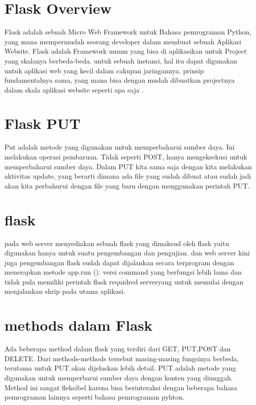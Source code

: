 \section{Flask Overview}
Flask adalah sebuah Micro Web Framework untuk Bahasa pemrograman Python, yang mana  mempermudah
seorang developer dalam membuat sebuah Aplikasi Website. Flask adalah Framework umum
yang bisa di aplikasikan untuk Project yang skalanya berbeda-beda. untuk sebuah 
instansi, hal itu dapat digunakan untuk aplikasi web yang kecil dalam cakupan jaringannya.
prinsip fundamentalnya sama, yang mana bisa dengan mudah dibuatkan projectnya dalam skala aplikasi
website seperti apa saja \cite{alemu2014rest}.
\section{Flask PUT}
Put adalah metode yang digunakan untuk memperbaharui sumber daya. Ini melakukan operasi pembaruan. 
Tidak seperti POST, hanya mengeksekusi untuk memperbaharui sumber daya. Dalam PUT kita sama saja dengan kita 
melakukan aktivitas update, yang berarti dimana ada file yang sudah dibuat atau sudah jadi akan kita perbahurui 
dengan file yang baru dengan menggunakan perintah PUT.

\section{flask}
pada web server menyediakan sebuah flask yang dimaksud oleh flask yaitu digunakan hanya untuk suatu pengembangan dan pengujian. dan web server kini juga pengembangan flask sudah  dapat dijalankan secara terprogram dengan menerapkan metode app.run (). versi command yang  berfungsi lebih lama dan tidak pula memiliki perintah flask requidred serveryang untuk memulai dengan menjalankan skrip pada utama aplikasi.

\section{methods dalam Flask}
Ada beberapa method dalam flask yang terdiri dari GET, PUT,POST dan DELETE. Dari methods-methods tersebut masing-masing fungsinya berbeda, terutama untuk PUT akan dijelaskan lebih detail. PUT adalah metode yang digunakan untuk memperbarui sumber daya dengan konten yang diunggah. Method ini sangat fleksibel karena bisa berinteraksi dengan beberapa bahasa pemrograman lainnya seperti bahasa pemrograman pyhton.

